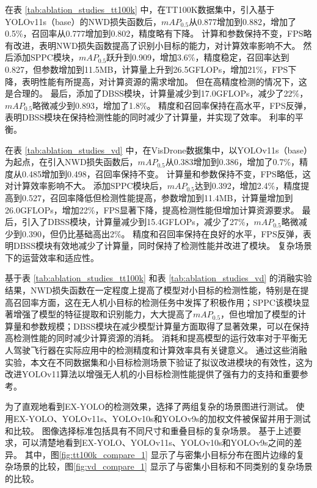 在表 \ref{tab:ablation_studies_tt100k} 中，在TT100K数据集中，引入基于YOLOv11s（base）的NWD损失函数后，$mAP_{0.5}$从0.877增加到0.882，增加了0.5\%，召回率从0.777增加到0.802，精度略有下降。 计算和参数保持不变，FPS略有改进，表明NWD损失函数提高了识别小目标的能力，对计算效率影响不大。 然后添加SPPC模块，$mAP_{0.5}$跃升到0.909，增加3.6\%，精度稳定，召回率达到0.827，但参数增加到11.5MB，计算量上升到26.5GFLOPs，增加21\%，FPS下降，表明性能有所提高，对计算资源的需求增加。 但在高精度检测的情况下，这是合理的。 最后，添加了DBSS模块，计算量减少到17.0GFLOPs，减少了22\%，$mAP_{0.5}$略微减少到0.893，增加了1.8\%。 精度和召回率保持在高水平，FPS反弹，表明DBSS模块在保持检测性能的同时减少了计算量，并实现了效率。 利率的平衡。

在表 \ref{tab:ablation_studies_vd} 中，在VisDrone数据集中，以YOLOv11s（base）为起点，在引入NWD损失函数后，$mAP_{0.5}$从0.383增加到0.386，增加了0.7\%，精度从0.485增加到0.498，召回率保持不变。 计算量和参数保持不变，FPS略低，这对计算效率影响不大。 添加SPPC模块后，$mAP_{0.5}$达到0.392，增加2.4\%，精度提高到0.527，召回率降低但检测性能提高，参数增加到11.4MB，计算量增加到26.0GFLOPs，增加22\%，FPS显著下降，提高检测性能但增加计算资源要求。 最后，引入了DBSS模块，计算量减少到15.4GFLOPs，减少了27\%，$mAP_{0.5}$略微减少到0.390，但仍比基础高出2\%。 精度和召回率保持在良好的水平，FPS反弹，表明DBSS模块有效地减少了计算量，同时保持了检测性能并改进了模块。 复杂场景下的运营效率和适应性。

基于表 \ref{tab:ablation_studies_tt100k} 和表 \ref{tab:ablation_studies_vd} 的消融实验结果，NWD损失函数在一定程度上提高了模型对小目标的检测性能，特别是在提高召回率方面，这在无人机小目标的检测任务中发挥了积极作用；SPPC该模块显著增强了模型的特征提取和识别能力，大大提高了$mAP_{0.5}$，但也增加了模型的计算量和参数规模；DBSS模块在减少模型计算量方面取得了显著效果，可以在保持高检测性能的同时减少计算资源的消耗。 消耗和提高模型的运行效率对于平衡无人驾驶飞行器在实际应用中的检测精度和计算效率具有关键意义。 通过这些消融实验，本文在不同数据集和小目标检测场景下验证了拟议改进模块的有效性，这为改进YOLOv11算法以增强无人机的小目标检测性能提供了强有力的支持和重要参考。

为了直观地看到EX-YOLO的检测效果，选择了两组复杂的场景图进行测试。 使用EX-YOLO、YOLOv11s、YOLOv10s和YOLOv9s的加权文件被保留并用于测试和比较。 图像选择标准包括具有不同尺寸和重叠目标的复杂场景。 基于上述要求，可以清楚地看到EX-YOLO、YOLOv11s、YOLOv10s和YOLOv9s之间的差异。 其中，图\ref{fig:tt100k_compare_1}
显示了与密集小目标分布在图片边缘的复杂场景的比较，图\ref{fig:vd_compare_1}
显示了与密集小目标和不同类别的复杂场景的比较。

